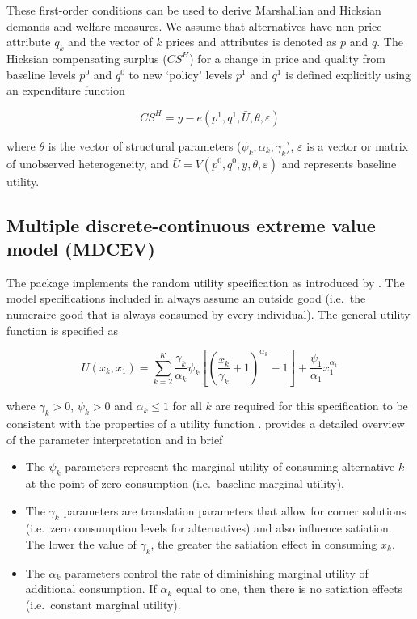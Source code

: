 These first-order conditions can be used to derive Marshallian and
Hicksian demands and welfare measures. We assume that alternatives have
non-price attribute \(q_{k}\) and the vector of \(k\) prices and
attributes is denoted as \(p\) and \(q\). The Hicksian compensating
surplus (\(CS^H\)) for a change in price and quality from baseline
levels \(p^0\) and \(q^0\) to new `policy' levels \(p^1\) and \(q^1\) is
defined explicitly using an expenditure function

\begin{equation}
\label{eq:welfare}
CS^H = y - e(p^1, q^1, \bar{U}, \theta, \varepsilon)
\end{equation}

\noindent where \(\theta\) is the vector of structural parameters
(\(\psi_k, \alpha_k, \gamma_k\)), \(\varepsilon\) is a vector or matrix
of unobserved heterogeneity, and
\(\bar{U} = V(p^0, q^0, y, \theta, \varepsilon)\) and represents
baseline utility.

\hypertarget{multiple-discrete-continuous-extreme-value-model-mdcev}{%
\subsection{Multiple discrete-continuous extreme value model
(MDCEV)}\label{multiple-discrete-continuous-extreme-value-model-mdcev}}

The  package implements the random utility specification as
introduced by \citet{bhatmultiple2008}. The model specifications
included in  always assume an outside good (i.e.~the
numeraire good that is always consumed by every individual). The general
utility function is specified as

\begin{equation}
U(x_k, x_1) = \sum_{k=2}^{K} \frac{\gamma_k}{\alpha_k}\psi_k \left[ \left( \frac{x_k}{\gamma_k} + 1 \right)^{\alpha_k} - 1 \right] + \frac{\psi_1}{\alpha_1}x_1^{\alpha_1} \label{utilkt}
\end{equation}

\noindent where \(\gamma_k > 0\), \(\psi_k > 0\) and \(\alpha_k \leq 1\)
for all \(k\) are required for this specification to be consistent with
the properties of a utility function \citep{bhatmultiple2008}.
\citet{bhatmultiple2008} provides a detailed overview of the parameter
interpretation and in brief

\begin{itemize}
\tightlist
\item
  The \(\psi_k\) parameters represent the marginal utility of consuming
  alternative \(k\) at the point of zero consumption (i.e.~baseline
  marginal utility).
\item
  The \(\gamma_k\) parameters are translation parameters that allow for
  corner solutions (i.e.~zero consumption levels for alternatives) and
  also influence satiation. The lower the value of \(\gamma_k\), the
  greater the satiation effect in consuming \(x_k\).
\item
  The \(\alpha_k\) parameters control the rate of diminishing marginal
  utility of additional consumption. If \(\alpha_k\) equal to one, then
  there is no satiation effects (i.e.~constant marginal utility).
\end{itemize}

